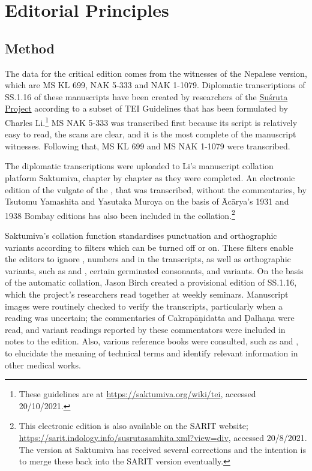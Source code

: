 
\section{Editorial Principles}
\subsection{Method}
The data for the critical edition comes from the witnesses of the Nepalese version, 
which are MS KL 699, NAK 5-333 and NAK 1-1079. Diplomatic transcriptions of 
SS.1.16 of these manuscripts have been created by researchers of the 
\href{https://sushrutaproject.org}{Suśruta 
Project}\space%
according to a subset of TEI Guidelines that has been formulated by Charles 
Li.\footnote{These guidelines are at \url{https://saktumiva.org/wiki/tei}, accessed 
20/10/2021.} MS NAK 5-333 was transcribed first because its script is relatively easy to 
read, the scans are clear, and it is the most complete of the manuscript 
witnesses. Following that, MS KL 699 and MS NAK 1-1079 were transcribed. 

The diplomatic transcriptions were uploaded to Li's manuscript collation platform
Saktumiva, chapter by chapter as they were completed. An electronic edition of the
vulgate of the \SS, that was transcribed, without the commentaries, by Tsutomu
Yamashita and Yasutaka Muroya on the basis of Ācārya's 1931 and 1938 Bombay
editions has also been included in the collation.\footnote{This electronic edition
    is also available on the SARIT website;
    \url{https://sarit.indology.info/susrutasamhita.xml?view=div}, accessed
    20/8/2021. The version at Saktumiva has received several corrections and the intention is 
    to merge these back into the SARIT version eventually.}

Saktumiva's  collation function standardises punctuation and 
orthographic variants according to filters which can be turned off or on. These 
filters enable the editors to ignore , numbers and 
 in the transcripts, as well as orthographic variants, such as 
 and , certain germinated consonants, and  
variants. On the basis of the automatic collation, Jason Birch created a provisional 
edition of SS.1.16, which the project's researchers read together at weekly 
seminars. Manuscript images were routinely checked to verify the transcripts, 
particularly when a reading was uncertain; the commentaries of Cakrapāṇidatta 
and Ḍalhaṇa were read, and variant readings reported by these commentators 
were included in notes to the edition. Also, various reference books were 
consulted, such as   \citet{josi-maha,nadk-1954} and \citet{meul-hist}, to 
elucidate the meaning of technical terms and identify relevant information in 
other medical works. 

